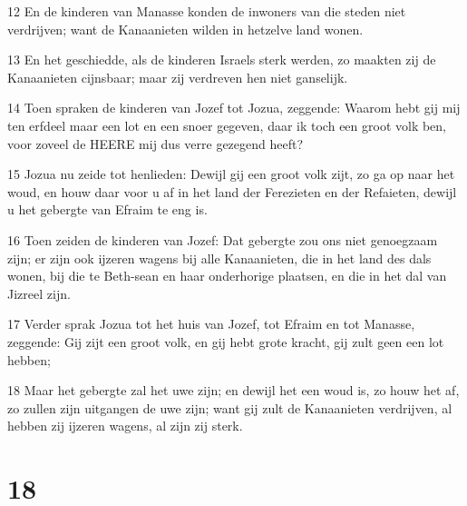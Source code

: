 \par 12 En de kinderen van Manasse konden de inwoners van die steden niet verdrijven; want de Kanaanieten wilden in hetzelve land wonen.
\par 13 En het geschiedde, als de kinderen Israels sterk werden, zo maakten zij de Kanaanieten cijnsbaar; maar zij verdreven hen niet ganselijk.
\par 14 Toen spraken de kinderen van Jozef tot Jozua, zeggende: Waarom hebt gij mij ten erfdeel maar een lot en een snoer gegeven, daar ik toch een groot volk ben, voor zoveel de HEERE mij dus verre gezegend heeft?
\par 15 Jozua nu zeide tot henlieden: Dewijl gij een groot volk zijt, zo ga op naar het woud, en houw daar voor u af in het land der Ferezieten en der Refaieten, dewijl u het gebergte van Efraim te eng is.
\par 16 Toen zeiden de kinderen van Jozef: Dat gebergte zou ons niet genoegzaam zijn; er zijn ook ijzeren wagens bij alle Kanaanieten, die in het land des dals wonen, bij die te Beth-sean en haar onderhorige plaatsen, en die in het dal van Jizreel zijn.
\par 17 Verder sprak Jozua tot het huis van Jozef, tot Efraim en tot Manasse, zeggende: Gij zijt een groot volk, en gij hebt grote kracht, gij zult geen een lot hebben;
\par 18 Maar het gebergte zal het uwe zijn; en dewijl het een woud is, zo houw het af, zo zullen zijn uitgangen de uwe zijn; want gij zult de Kanaanieten verdrijven, al hebben zij ijzeren wagens, al zijn zij sterk.

\chapter{18}

